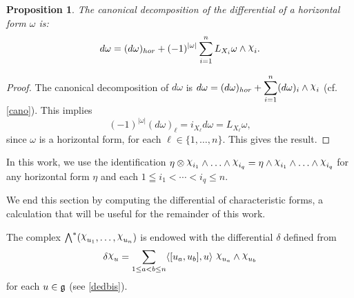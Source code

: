 \documentclass[a4paper,oneside,10pt,reqno]{amsart}
\newtheorem{proposition}[theorem]{Proposition}
\theoremstyle{definition}
\newcommand{\g}{\noindent {\mathfrak{g}}}
\newcommand\chii{\raise2pt\hbox{$\chi$}}
\newcommand\om{\omega}
\begin{document}
 
\begin{proposition}\label{P2}
The canonical decomposition of  the differential of a horizontal form $\omega$ is:
 \begin{equation}\label{horib}
 d \omega = (d\omega)_{hor} + (-1)^{|\omega|}  \sum_{i =1}^n  L_{X_i} \omega \wedge\chii_i.
 \end{equation}
 \end{proposition}
  \begin{proof}
The canonical decomposition of $d\om$ is $\displaystyle d \omega = (d\omega)_{hor} + \sum_{i =1}^n (d \omega)_i  \wedge \chii_i$ (cf. \eqref{cano}). This implies
$$
 (-1)^{|\om|} (d \omega)_\ell =  i_{X_\ell} d\om = L_{X_\ell} \om,
$$
since $\om$ is a horizontal form, for each $\ell \in \{1, \ldots,n\}$. This gives the result.
\end{proof}
 



In this work, we use  the identification
$\eta \otimes \chii_{i_1}\wedge  \ldots \wedge  \chii_{i_q}  =\eta \wedge \chii_{i_1}\wedge  \ldots \wedge  \chii_{i_q} $ 
for any horizontal form $\eta$ and each $1\leqq i_1 < \cdots < i_q\leq n$.


We end this section by computing the differential of characteristic forms, 
a calculation that will be useful for the remainder of this work.


The complex $\bigwedge^* (\chii_{u_1}, \ldots, \chii_{u_n})$ is endowed with the differential $\delta$  defined from
  \begin{equation}\label{ded}
 \delta \chii_u =
 \sum_{1\leq a <b\leq n} \langle [u_a,u_b],u\rangle  \  \chii_{u_a} \wedge \chii_{u_b}
 \end{equation}
for each $u\in \g$  (see \eqref{dedbis}).
\end{document}
